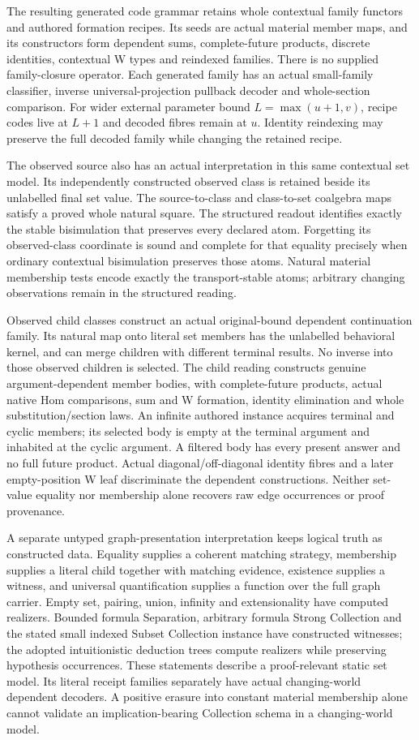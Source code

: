 \documentclass[11pt]{article}
\theoremstyle{definition}
\theoremstyle{remark}
\begin{document}
The resulting generated code grammar retains whole contextual family
functors and authored formation recipes. Its seeds are actual material
member maps, and its constructors form dependent sums, complete-future
products, discrete identities, contextual W types and reindexed families.
There is no supplied family-closure operator. Each generated family has
an actual small-family classifier, inverse universal-projection pullback
decoder and whole-section comparison. For wider external parameter bound
\(L=\max(u+1,v)\), recipe codes live at \(L+1\) and decoded fibres
remain at \(u\). Identity reindexing may preserve the full decoded family
while changing the retained recipe.

The observed source also has an actual interpretation in this same
contextual set model. Its independently constructed observed class is
retained beside its unlabelled final set value. The source-to-class and
class-to-set coalgebra maps satisfy a proved whole natural square.
The structured readout identifies exactly the stable bisimulation that
preserves every declared atom. Forgetting its observed-class coordinate
is sound and complete for that equality precisely when ordinary
contextual bisimulation preserves those atoms. Natural material
membership tests encode exactly the transport-stable atoms; arbitrary
changing observations remain in the structured reading.

Observed child classes construct an actual original-bound dependent
continuation family. Its natural map onto literal set members has the
unlabelled behavioral kernel, and can merge children with different
terminal results. No inverse into those observed children is selected.
The child reading constructs genuine argument-dependent member bodies,
with complete-future products, actual native Hom comparisons, sum and W
formation, identity elimination and whole substitution/section laws.
An infinite authored instance acquires terminal and cyclic members;
its selected body is empty at the terminal argument and inhabited at
the cyclic argument. A filtered body has every present answer and no
full future product. Actual diagonal/off-diagonal identity fibres and
a later empty-position W leaf discriminate the dependent constructions.
Neither set-value equality nor membership alone recovers raw edge
occurrences or proof provenance.

A separate untyped graph-presentation interpretation keeps logical
truth as constructed data. Equality supplies a coherent matching strategy,
membership supplies a literal child together with matching evidence,
existence supplies a witness, and universal quantification supplies a
function over the full graph carrier. Empty set, pairing, union, infinity
and extensionality have computed realizers. Bounded formula Separation,
arbitrary formula Strong Collection and the stated small indexed
Subset Collection instance have constructed witnesses; the adopted
intuitionistic deduction trees compute realizers while preserving
hypothesis occurrences. These statements describe a proof-relevant
static set model. Its literal receipt families separately have actual
changing-world dependent decoders. A positive erasure into constant
material membership alone cannot validate an implication-bearing
Collection schema in a changing-world model.
\end{document}
